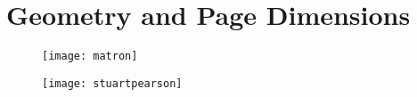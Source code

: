 \chapter{Geometry and Page Dimensions}

\lipsum[1-4]\marginnote[1pt]{\lorem
    \lorem}

\lipsum[1-2]

\def\asidecaption{\parbox{4.2cm}{{\bfseries Image \thefigure}\par\lorem}%
}
\def\ps@caption{%
     \let\@oddfoot\@empty\let\@evenfoot\@empty%
    \def\@evenhead{%
        \begin{picture}(0,0)%
           \put(-150,-80){\asidecaption\par}%
            \stepcounter{figure}
           \put(-150,-370){\asidecaption}%
        \end{picture}%
      }%
    \let\@oddhead\@evenhead%
    \let\@mkboth\@gobbletwo%
    \let\chaptermark\@gobble%
    \let\sectionmark\@gobble%
 }

\def\ps@bigpicture{%
    \setlength\headheight{19cm}%
    \let\@oddfoot\@empty\let\@evenfoot\@empty%
    \def\@evenhead{%
         \begin{picture}(0,0)%
          \put(-149,0){\texttt{[image: stuartpearson]}}%
         \end{picture}%
      }%
    \let\@oddhead\@evenhead%
    \let\@mkboth\@gobbletwo%
    \let\chaptermark\@gobble%
    \let\sectionmark\@gobble%
 }


\def\doubletakeimage{%
  \renewcommand{\topfraction}{.95}  %
  \begin{figure}[t]
    \thispagestyle{caption}
    \texttt{[image: matron]}%
  \end{figure}

  \begin{figure}[tp]
   \hspace*{-\marginparwidth}\texttt{[image: stuartpearson]}
 \end{figure}
}


\doubletakeimage
\lipsum[1-4]

\restoregeometry
\addtocounter{chapter}{-2}
\@toctrue\@specialtrue

